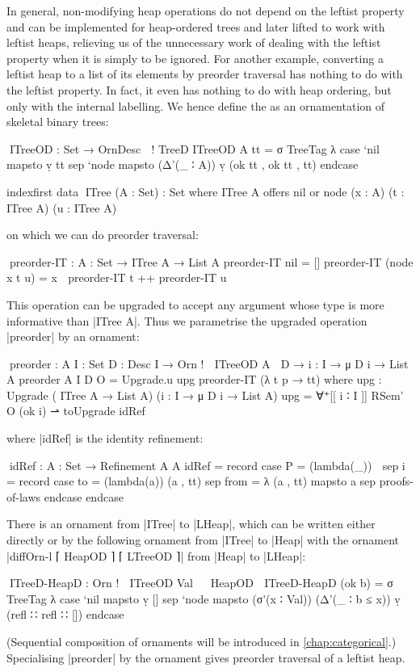 In general, non-modifying heap operations do not depend on the leftist property and can be implemented for heap-ordered trees and later lifted to work with leftist heaps, relieving us of the unnecessary work of dealing with the leftist property when it is simply to be ignored.
For another example, converting a leftist heap to a list of its elements by preorder traversal has nothing to do with the leftist property.
In fact, it even has nothing to do with heap ordering, but only with the internal labelling.
We hence define the  as an ornamentation of skeletal binary trees:
\begin{code}
^^^ITreeOD : Set → OrnDesc ⊤ ! TreeD
ITreeOD A tt = σ TreeTag  λ  case  `nil   mapsto  ṿ tt
                             sep   `node  mapsto  (Δ'(_ ∶ A)) ṿ (ok tt , ok tt , tt) endcase

indexfirst data ^^^ITree (A : Set) : Set where
  ITree A  offers  nil
           or      node (x : A) (t : ITree A) (u : ITree A)
\end{code}
on which we can do preorder traversal:
\begin{code}
^^^preorder-IT : {A : Set} → ITree A → List A
preorder-IT nil           =  []
preorder-IT (node x t u)  =  x ∷ preorder-IT t ++ preorder-IT u
\end{code}
This operation can be upgraded to accept any argument whose type is more informative than |ITree A|.
Thus we parametrise the upgraded operation |preorder| by an ornament:
\begin{code}
^^^preorder :  {A I : Set} {D : Desc I} → Orn ! ⌊ ITreeOD A ⌋ D →
               {i : I} → μ D i → List A
preorder {A} {I} {D} O = Upgrade.u upg preorder-IT (λ t p → tt)
  where  upg : Upgrade  (           ITree A  → List A)
                        ({i : I} →  μ D i    → List A)
         upg = ∀⁺[[ i ∶ I ]] RSem' O (ok i) ⇀ toUpgrade idRef
\end{code}
where |idRef| is the identity refinement:
\begin{code}
^^^idRef : {A : Set} → Refinement A A
idRef = record  case  P  = (lambda(_)) ⊤
                sep   i  = record  case  to    = (lambda(a)) (a , tt)
                                   sep   from  = λ { (a , tt) mapsto a }
                                   sep   proofs-of-laws endcase endcase
\end{code}
There is an ornament from |ITree| to |LHeap|, which can be written either directly or by  the following ornament from |ITree| to |Heap| with the ornament |diffOrn-l ⌈ HeapOD ⌉ ⌈ LTreeOD ⌉| from |Heap| to |LHeap|:
\begin{code}
^^^ITreeD-HeapD : Orn ! ⌊ ITreeOD Val ⌋ ⌊ HeapOD ⌋
ITreeD-HeapD (ok b) =
  σ TreeTag λ  case  `nil   mapsto  ṿ []
               sep   `node  mapsto  (σ'(x ∶ Val)) (Δ'(_ ∶ b ≤ x)) ṿ (refl ∷ refl ∷ []) endcase
\end{code}
(Sequential composition of ornaments will be introduced in \autoref{chap:categorical}.)
Specialising |preorder| by the ornament gives preorder traversal of a leftist heap.

